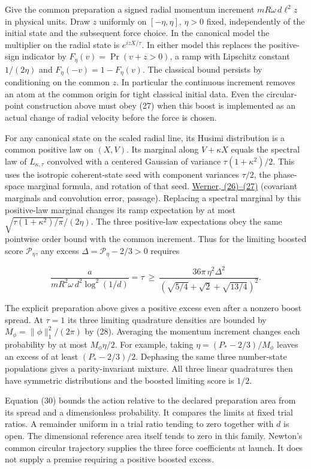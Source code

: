 \documentclass[11pt,a4paper]{article}
\begin{document}
Give the common preparation a signed radial momentum increment
\(mR\omega\,d\ell^2 z\) in physical units. Draw \(z\) uniformly on
\([-\eta,\eta]\), \(\eta>0\) fixed, independently of the initial state
and the subsequent force choice. In the canonical model the multiplier
on the radial state is \(e^{izX/\tau}\). In either model this replaces
the positive-sign indicator by \(F_\eta(v)=\Pr(v+z>0)\), a ramp with
Lipschitz constant \(1/(2\eta)\) and \(F_\eta(-v)=1-F_\eta(v)\). The
classical bound persists by conditioning on the common \(z\). In
particular the continuous increment removes an atom at the common origin
for tight classical initial data. Even the circular-point construction
above must obey (27) when this boost is implemented as an actual change
of radial velocity before the force is chosen.

For any canonical state on the scaled radial line, its Husimi
distribution is a common positive law on \((X,V)\). Its marginal along
\(V+\kappa X\) equals the spectral law of \(L_{\kappa,\tau}\) convolved
with a centered Gaussian of variance \(\tau(1+\kappa^2)/2\). This uses
the isotropic coherent-state seed with component variances \(\tau/2\),
the phase-space marginal formula, and rotation of that seed.
\href{https://www.rintonpress.com/xqic4/qic-4-67/546-562.pdf}{Werner,
(26)--(27)} (covariant marginals and convolution error, passage).
Replacing a spectral marginal by this positive-law marginal changes its
ramp expectation by at most \(\sqrt{\tau(1+\kappa^2)/\pi}/(2\eta)\). The
three positive-law expectations obey the same pointwise order bound with
the common increment. Thus for the limiting boosted score
\(\mathcal P_\eta\), any excess \(\Delta=\mathcal P_\eta-2/3>0\)
requires

\[
 \frac{a}{mR^2\omega\,d^2\log^2(1/d)}
 =\tau\ \ge\
 \frac{36\pi\,\eta^2\Delta^2}
 {(\sqrt{5/4}+\sqrt{2}+\sqrt{13/4})^2}.                         \tag{30}
\]

The explicit preparation above gives a positive excess even after a
nonzero boost spread. At \(\tau=1\) its three limiting quadrature
densities are bounded by \(M_\phi=\|\phi\|_1^2/(2\pi)\) by (28).
Averaging the momentum increment changes each probability by at most
\(M_\phi\eta/2\). For example, taking \(\eta=(P_*-2/3)/M_\phi\) leaves
an excess of at least \((P_*-2/3)/2\). Dephasing the same three
number-state populations gives a parity-invariant mixture. All three
linear quadratures then have symmetric distributions and the boosted
limiting score is \(1/2\).

Equation (30) bounds the action relative to the declared preparation
area from its spread and a dimensionless probability. It compares the
limits at fixed trial ratios. A remainder uniform in a trial ratio
tending to zero together with \(d\) is open. The dimensional reference
area itself tends to zero in this family. Newton's common circular
trajectory supplies the three force coefficients at launch. It does not
supply a premise requiring a positive boosted excess.
\end{document}
